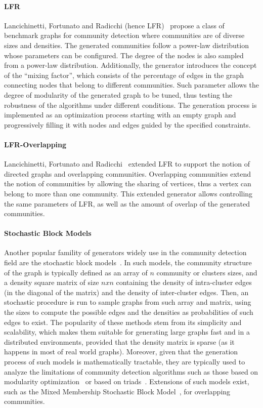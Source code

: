 \paragraph{LFR} Lancichinetti, Fortunato
and Radicchi (hence LFR)~\cite{PhysRevE.78.046110} propose a class of benchmark
graphs for community detection where communities are of diverse sizes and
densities. The generated communities follow a power-law distribution whose parameters can be configured. The degree of the
nodes is also sampled from a power-law distribution. Additionally, the generator
introduces the concept of the ``mixing factor'', which consists of the percentage of
edges in the graph connecting nodes that belong to different communities. Such parameter
allows  the degree of modularity of the generated graph  to be tuned, thus
testing the robustness of the algorithms under different conditions. The
generation process is implemented as an optimization process starting with an empty graph and
progressively filling it with nodes and edges guided by the specified constraints.

\paragraph{LFR-Overlapping} Lancichinetti, Fortunato and
Radicchi~\cite{PhysRevE.80.016118} extended LFR to support the notion of
directed graphs and overlapping communities. Overlapping communities extend the
notion of communities by allowing the sharing of vertices, thus a vertex can
belong to more than one community. This extended generator allows controlling
the same parameters of LFR, as well as the amount of overlap of
the generated communities.

\paragraph{Stochastic Block Models} Another popular famility of generators
widely use in the community detection field are the stochastic block
models~\cite{holland1983stochastic}. In such models, the community structure of
the graph is typically defined as an array of $n$ community or clusters sizes,
and a density square matrix of size $nxn$ containing the density of
intra-cluster edges (in the diagonal of the matrix) and the density of
inter-cluster edges. Then, an stochastic procedure is run to sample graphs
from such array and matrix, using the sizes to compute the possible edges
and the densities as probabilities of such edges to exist. The popularity of
these methods stem from its simplicity and scalability, which makes them
suitable for generating large graphs fast and in a distributed environments,
provided that the density matrix is sparse (as it happens in most of real
                                            world graphs). Moreover, given
that the generation process of such models is mathematically tractable, they
are typically used to analyze the limitations of community detection
algorithms such as those based on modularity
optimization~\cite{fortunato2007resolution} or based on
triads~\cite{prat2016put}. Extensions of such models exist, such as the
Mixed Membership Stochastic Block Model~\cite{arioldi2008mixed}, for
overlapping communities.

